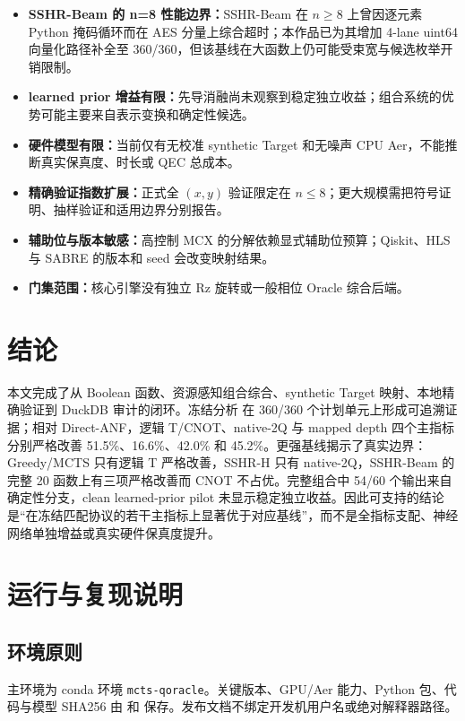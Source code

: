 \documentclass[UTF8,a4paper,12pt]{ctexart}
\begin{document}
\begin{itemize}
  \item \textbf{SSHR-Beam 的 n=8 性能边界：}SSHR-Beam 在 $n\geq8$ 上曾因逐元素 Python 掩码循环而在 AES 分量上综合超时；本作品已为其增加 4-lane uint64 向量化路径补全至 360/360，但该基线在大函数上仍可能受束宽与候选枚举开销限制。
  \item \textbf{learned prior 增益有限：}先导消融尚未观察到稳定独立收益；组合系统的优势可能主要来自表示变换和确定性候选。
  \item \textbf{硬件模型有限：}当前仅有无校准 synthetic Target 和无噪声 CPU Aer，不能推断真实保真度、时长或 QEC 总成本。
  \item \textbf{精确验证指数扩展：}正式全 $(x,y)$ 验证限定在 $n\leq8$；更大规模需把符号证明、抽样验证和适用边界分别报告。
  \item \textbf{辅助位与版本敏感：}高控制 MCX 的分解依赖显式辅助位预算；Qiskit、HLS 与 SABRE 的版本和 seed 会改变映射结果。
  \item \textbf{门集范围：}核心引擎没有独立 Rz 旋转或一般相位 Oracle 综合后端。
\end{itemize}

\section{结论}

本文完成了从 Boolean 函数、资源感知组合综合、synthetic Target 映射、本地精确验证到 DuckDB 审计的闭环。冻结分析 \texttt{\FinalAnalysisID} 在 360/360 个计划单元上形成可追溯证据；相对 Direct-ANF，逻辑 T/CNOT、native-2Q 与 mapped depth 四个主指标分别严格改善 51.5\%、16.6\%、42.0\% 和 45.2\%。更强基线揭示了真实边界：Greedy/MCTS 只有逻辑 T 严格改善，SSHR-H 只有 native-2Q，SSHR-Beam 的完整 20 函数上有三项严格改善而 CNOT 不占优。完整组合中 54/60 个输出来自确定性分支，clean learned-prior pilot 未显示稳定独立收益。因此可支持的结论是“在冻结匹配协议的若干主指标上显著优于对应基线”，而不是全指标支配、神经网络单独增益或真实硬件保真度提升。

\appendix
\section{运行与复现说明}
\label{app:repro}

\subsection{环境原则}

主环境为 conda 环境 \texttt{mcts-qoracle}。关键版本、GPU/Aer 能力、Python 包、代码与模型 SHA256 由  和  保存。发布文档不绑定开发机用户名或绝对解释器路径。
\end{document}
